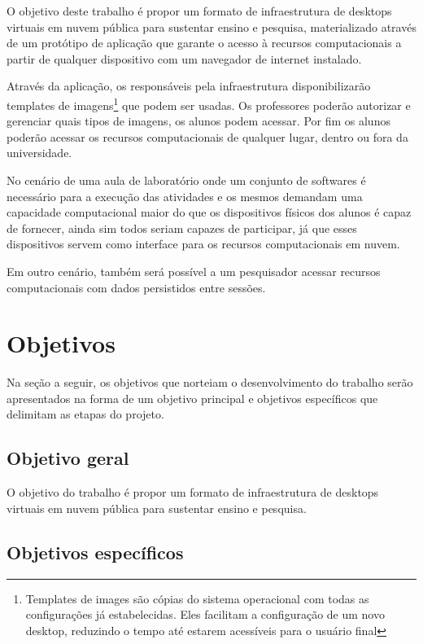 O objetivo deste trabalho é propor um formato de infraestrutura de \glspl{desktop} virtuais em
nuvem pública para sustentar ensino e pesquisa, materializado através de um protótipo de aplicação
que garante o acesso à recursos computacionais a partir de qualquer dispositivo com um navegador de
internet instalado.

Através da aplicação, os responsáveis pela infraestrutura disponibilizarão templates de
imagens\footnote{Templates de images são cópias do sistema operacional com todas as configurações já
estabelecidas. Eles facilitam a configuração de um novo \gls{desktop}, reduzindo o tempo até
estarem acessíveis para o usuário final} que podem ser usadas. Os professores poderão autorizar e
gerenciar quais tipos de imagens, os alunos podem acessar. Por fim os alunos poderão acessar os
recursos computacionais de qualquer lugar, dentro ou fora da universidade.

No cenário de uma aula de laboratório onde um conjunto de softwares é necessário para a execução das
atividades e os mesmos demandam uma capacidade computacional maior do que os dispositivos físicos
dos alunos é capaz de fornecer, ainda sim todos seriam capazes de participar, já que esses
dispositivos servem como interface para os recursos computacionais em nuvem.

Em outro cenário, também será possível a um pesquisador acessar recursos computacionais com dados
persistidos entre sessões. 

\section{Objetivos}\label{sec:objetivos}

Na seção a seguir, os objetivos que norteiam o desenvolvimento do trabalho serão apresentados na
forma de um objetivo principal e objetivos específicos que delimitam as etapas do projeto.

\subsection{Objetivo geral}\label{subsec:objetivoGeral}

O objetivo do trabalho é propor um formato de infraestrutura de \glspl{desktop} virtuais em nuvem
pública para sustentar ensino e pesquisa.

\subsection{Objetivos específicos}\label{subsec:objetivosEspecificos}


